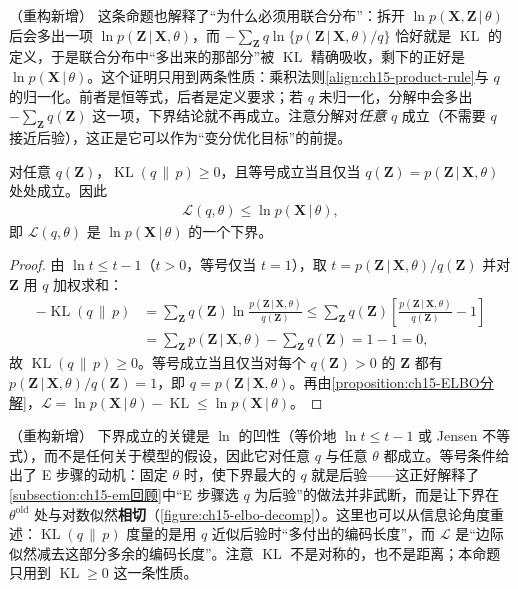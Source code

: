 \documentclass[../../main.tex]{subfiles}
\begin{document}
\begin{remark}（重构新增）
这条命题也解释了“为什么必须用联合分布”：拆开 $\ln p(\bm{X},\bm{Z}\,|\,\theta)$ 后会多出一项 $\ln p(\bm{Z}\,|\,\bm{X},\theta)$，而 $-\sum_{\bm{Z}}q\ln\{p(\bm{Z}\,|\,\bm{X},\theta)/q\}$ 恰好就是 $\operatorname{KL}$ 的定义，于是联合分布中“多出来的那部分”被 $\operatorname{KL}$ 精确吸收，剩下的正好是 $\ln p(\bm{X}\,|\,\theta)$。这个证明只用到两条性质：乘积法则\eqref{align:ch15-product-rule}与 $q$ 的归一化。前者是恒等式，后者是定义要求；若 $q$ 未归一化，分解中会多出 $-\sum_{\bm{Z}}q(\bm{Z})$ 这一项，下界结论就不再成立。注意分解对\emph{任意} $q$ 成立（不需要 $q$ 接近后验），这正是它可以作为“变分优化目标”的前提。
\end{remark}

\begin{proposition}\label{proposition:ch15-ELBO下界}
对任意 $q(\bm{Z})$，$\operatorname{KL}\!\left(q\,\|\,p\right)\geqslant0$，且等号成立当且仅当 $q(\bm{Z})=p(\bm{Z}\,|\,\bm{X},\theta)$ 处处成立。因此
\begin{align*}
\mathcal{L}(q,\theta)\leqslant\ln p(\bm{X}\,|\,\theta),
\end{align*}
即 $\mathcal{L}(q,\theta)$ 是 $\ln p(\bm{X}\,|\,\theta)$ 的一个下界。
\end{proposition}
\begin{proof}
由 $\ln t\leqslant t-1$（$t>0$，等号仅当 $t=1$），取 $t=p(\bm{Z}\,|\,\bm{X},\theta)/q(\bm{Z})$ 并对 $\bm{Z}$ 用 $q$ 加权求和：
\begin{align*}
-\operatorname{KL}(q\,\|\,p)
&=\sum_{\bm{Z}}q(\bm{Z})\ln\frac{p(\bm{Z}\,|\,\bm{X},\theta)}{q(\bm{Z})}
\leqslant\sum_{\bm{Z}}q(\bm{Z})\left[\frac{p(\bm{Z}\,|\,\bm{X},\theta)}{q(\bm{Z})}-1\right]\\
&=\sum_{\bm{Z}}p(\bm{Z}\,|\,\bm{X},\theta)-\sum_{\bm{Z}}q(\bm{Z})=1-1=0,
\end{align*}
故 $\operatorname{KL}(q\,\|\,p)\geqslant0$。等号成立当且仅当对每个 $q(\bm{Z})>0$ 的 $\bm{Z}$ 都有 $p(\bm{Z}\,|\,\bm{X},\theta)/q(\bm{Z})=1$，即 $q=p(\bm{Z}\,|\,\bm{X},\theta)$。再由\cref{proposition:ch15-ELBO分解}，$\mathcal{L}=\ln p(\bm{X}\,|\,\theta)-\operatorname{KL}\leqslant\ln p(\bm{X}\,|\,\theta)$。
\end{proof}

\begin{remark}（重构新增）
下界成立的关键是 $\ln$ 的凹性（等价地 $\ln t\leqslant t-1$ 或 Jensen 不等式），而不是任何关于模型的假设，因此它对任意 $q$ 与任意 $\theta$ 都成立。等号条件给出了 E 步骤的动机：固定 $\theta$ 时，使下界最大的 $q$ 就是后验——这正好解释了\cref{subsection:ch15-em回顾}中“E 步骤选 $q$ 为后验”的做法并非武断，而是让下界在 $\theta^{\text{old}}$ 处与对数似然\textbf{相切}（\cref{figure:ch15-elbo-decomp}）。这里也可以从信息论角度重述：$\operatorname{KL}(q\,\|\,p)$ 度量的是用 $q$ 近似后验时“多付出的编码长度”，而 $\mathcal{L}$ 是“边际似然减去这部分多余的编码长度”。注意 $\operatorname{KL}$ 不是对称的，也不是距离；本命题只用到 $\operatorname{KL}\geqslant0$ 这一条性质。
\end{remark}
\end{document}

